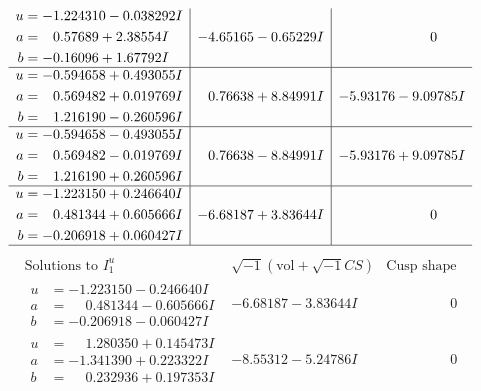 \documentclass[1p]{elsarticle_modified}
\theoremstyle{definition}
\newcommand{\I}{\sqrt{-1}}
\begin{document}
$$\begin{array}{c|c|c}
\begin{aligned}
u &= -1.224310 - 0.038292 I \\
a &= \phantom{-}0.57689 + 2.38554 I \\
b &= -0.16096 + 1.67792 I\end{aligned}
 & -4.65165 - 0.65229 I & \phantom{-0.000000 } 0 \\ \hline\begin{aligned}
u &= -0.594658 + 0.493055 I \\
a &= \phantom{-}0.569482 + 0.019769 I \\
b &= \phantom{-}1.216190 - 0.260596 I\end{aligned}
 & \phantom{-}0.76638 + 8.84991 I & -5.93176 - 9.09785 I \\ \hline\begin{aligned}
u &= -0.594658 - 0.493055 I \\
a &= \phantom{-}0.569482 - 0.019769 I \\
b &= \phantom{-}1.216190 + 0.260596 I\end{aligned}
 & \phantom{-}0.76638 - 8.84991 I & -5.93176 + 9.09785 I \\ \hline\begin{aligned}
u &= -1.223150 + 0.246640 I \\
a &= \phantom{-}0.481344 + 0.605666 I \\
b &= -0.206918 + 0.060427 I\end{aligned}
 & -6.68187 + 3.83644 I & \phantom{-0.000000 } 0\\
 \hline 
 \end{array}$$\newpage$$\begin{array}{c|c|c}  
\text{Solutions to }I^u_{1}& \I (\text{vol} + \sqrt{-1}CS) & \text{Cusp shape}\\
 \hline 
\begin{aligned}
u &= -1.223150 - 0.246640 I \\
a &= \phantom{-}0.481344 - 0.605666 I \\
b &= -0.206918 - 0.060427 I\end{aligned}
 & -6.68187 - 3.83644 I & \phantom{-0.000000 } 0 \\ \hline\begin{aligned}
u &= \phantom{-}1.280350 + 0.145473 I \\
a &= -1.341390 + 0.223322 I \\
b &= \phantom{-}0.232936 + 0.197353 I\end{aligned}
 & -8.55312 - 5.24786 I & \phantom{-0.000000 } 0 \\ \hline\begin{aligned}

\end{aligned}
\end{array}$$
\end{document}
